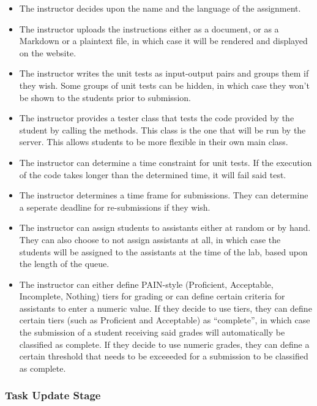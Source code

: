 \documentclass[a4paper, 12pt]{article}
\begin{document}
    \begin{itemize}
        \item The instructor decides upon the name and the language of the assignment.
        \item The instructor uploads the instructions either as a document, or as a Markdown
          or a plaintext file, in which case it will be rendered and displayed on the website.
        \item The instructor writes the unit tests as input-output pairs and groups them if
          they wish. Some groups of unit tests can be hidden, in which case they won't be
          shown to the students prior to submission.
        \item The instructor provides a tester class that tests the code provided by the student
        by calling the methods. This class is the one that will be run by the server. This allows students
        to be more flexible in their own main class.
        \item The instructor can determine a time constraint for unit tests. If the execution
          of the code takes longer than the determined time, it will fail said test.
        \item The instructor determines a time frame for submissions. They can determine a
          seperate deadline for re-submissions if they wish.
        \item The instructor can assign students to assistants either at random or by hand.
          They can also choose to not assign assistants at all, in which case the students
          will be assigned to the assistants at the time of the lab, based upon the length
          of the queue.
        \item The instructor can either define PAIN-style (Proficient, Acceptable, Incomplete, Nothing)
          tiers for grading or can define certain criteria for assistants to enter a numeric value. If they
          decide to use tiers, they can define certain tiers (such as Proficient and Acceptable) as ``complete'',
          in which case the submission of a student receiving said grades will automatically be classified as complete.
          If they decide to use numeric grades, they can define a certain threshold that needs to be exceeeded for a
          submission to be classified as complete.
    \end{itemize}

    \subsubsection{Task Update Stage}
\end{document}

